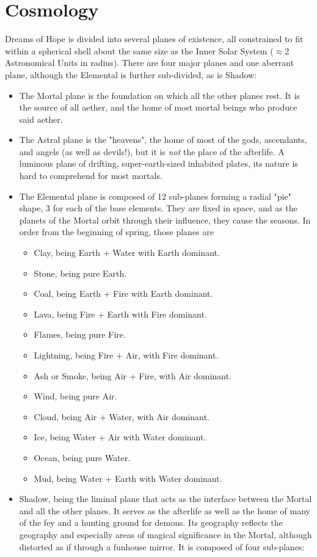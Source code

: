 \section{Cosmology}
Dreams of Hope is divided into several planes of existence, all constrained to fit within a spherical shell about the same size as the Inner Solar System ($\approx$2 Astronomical Units in radius). There are four major planes and one aberrant plane, although the Elemental is further sub-divided, as is Shadow:
\begin{itemize}
	\item The Mortal plane is the foundation on which all the other planes rest. It is the source of all aether, and the home of most mortal beings who produce said aether.
	\item The Astral plane is the "heavens", the home of most of the gods, ascendants, and angels (as well as devils!), but it is \textit{not} the place of the afterlife. A luminous plane of drifting, super-earth-sized inhabited plates, its nature is hard to comprehend for most mortals.
	\item The Elemental plane is composed of 12 sub-planes forming a radial "pie" shape, 3 for each of the base elements. They are fixed in space, and as the planets of the Mortal orbit through their influence, they cause the seasons. In order from the beginning of spring, those planes are
	\begin{itemize}
		\item Clay, being Earth + Water with Earth dominant.
		\item Stone, being pure Earth.
		\item Coal, being Earth + Fire with Earth dominant.
		\item Lava, being Fire + Earth with Fire dominant.
		\item Flames, being pure Fire.
		\item Lightning, being Fire + Air, with Fire dominant.
		\item Ash or Smoke, being Air + Fire, with Air dominant.
		\item Wind, being pure Air.
		\item Cloud, being Air + Water, with Air dominant.
		\item Ice, being Water + Air with Water dominant.
		\item Ocean, being pure Water.
		\item Mud, being Water + Earth with Water dominant.
	\end{itemize}
	\item Shadow, being the liminal plane that acts as the interface between the Mortal and all the other planes. It serves as the afterlife as well as the home of many of the fey and a hunting ground for demons. Its geography reflects the geography and especially areas of magical significance in the Mortal, although distorted as if through a funhouse mirror. It is composed of four sub-planes:

\end{itemize}
